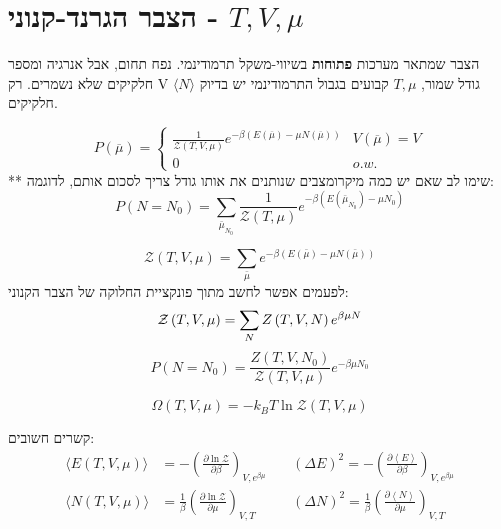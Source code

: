 \section{הצבר הגרנד-קנוני - $T,V,\mu$}
הצבר שמתאר מערכות \textbf{פתוחות} בשיווי-משקל תרמודינמי.
נפח תחום, אבל אנרגיה ומספר חלקיקים שלא נשמרים.
רק V גודל שמור, $T,\mu$ קבועים
בגבול התרמודינמי יש בדיוק $\langle N \rangle$ חלקיקים.

\begin{cheatformula}
$$
 P \left(\overline{\mu}\right) = \begin{cases}
     \frac{1}{\mathcal{Z} \left( T,V,\mu \right)} e^{-\beta\left( E\left(\overline{\mu}\right) - \mu N\left(\overline{\mu}\right)  \right)} &  V\left(\overline{\mu}\right)=V\\
     0 & o.w.
 \end{cases}
 $$
 ** שימו לב שאם יש כמה מיקרומצבים שנותנים את אותו גודל צריך לסכום אותם, לדוגמה:
 $$ P\left(N = N_0\right) = \sum_{\bar{\mu}_{N_0}} \frac{1}{\mathcal{Z}\left(T,\mu\right)} e^{-\beta\left( E\left(\bar{\mu}_{N_0}\right) - \mu N_0  \right)}  $$
\end{cheatformula}

\begin{cheatformula}
\[
\mathcal{Z} \left( T, V,\mu \right) = \sum_{\bar{\mu}} e^{-\beta \left( E(\bar{\mu}) - \mu N(\bar{\mu}) \right) } 
\]
לפעמים אפשר לחשב מתוך פונקציית החלוקה של הצבר הקנוני:
\[
\mathcal{Z} \left( T, V,\mu \right) = \sum_{N} Z \left( T, V, N \right) e^{\beta \mu N} \\
\]
\[
P \left(N=N_0\right) = \frac{Z \left( T, V, N_0 \right) }{\mathcal{Z} \left( T,V,\mu \right)} e^{-\beta \mu N_0}
\]
\end{cheatformula}


\begin{cheatformula}
\[
\Omega \left( T,V,\mu \right) = -k_B T \ln \mathcal{Z} \left( T,V,\mu \right)
\]
\end{cheatformula}

קשרים חשובים:
    \begin{align*}
\langle E \left( T,V,\mu \right) \rangle &= - \left( \frac{\partial \ln \mathcal{Z}}{\partial \beta} \right)_{V,e^{\beta \mu }} &&\: \left( \Delta E \right) ^2 = - \left( \frac{\partial \left< E \right> }{\partial \beta}  \right)_{V,e^{\beta \mu }} \\[1em]
\langle N \left( T,V,\mu \right) \rangle &= \frac{1}{\beta} \left( \frac{\partial \ln \mathcal{Z}}{\partial \mu} \right)_{V,T } &&\: \left( \Delta N \right) ^2 = \frac{1}{\beta} \left( \frac{\partial \left< N \right> }{\partial \mu}  \right)_{V,T}
\end{align*}

